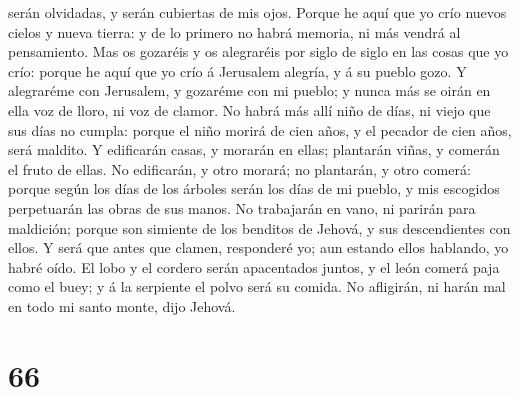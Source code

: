 serán olvidadas, y serán cubiertas de mis ojos.  Porque he
aquí que yo crío nuevos cielos y nueva tierra: y de lo primero no habrá
memoria, ni más vendrá al pensamiento.  Mas os gozaréis y
os alegraréis por siglo de siglo en las cosas que yo crío: porque he
aquí que yo crío á Jerusalem alegría, y á su pueblo gozo. 
Y alegraréme con Jerusalem, y gozaréme con mi pueblo; y nunca más se
oirán en ella voz de lloro, ni voz de clamor.  No habrá más
allí niño de días, ni viejo que sus días no cumpla: porque el niño
morirá de cien años, y el pecador de cien años, será maldito.
 Y edificarán casas, y morarán en ellas; plantarán viñas, y
comerán el fruto de ellas.  No edificarán, y otro morará;
no plantarán, y otro comerá: porque según los días de los árboles serán
los días de mi pueblo, y mis escogidos perpetuarán las obras de sus
manos.  No trabajarán en vano, ni parirán para maldición;
porque son simiente de los benditos de Jehová, y sus descendientes con
ellos.  Y será que antes que clamen, responderé yo; aun
estando ellos hablando, yo habré oído.  El lobo y el
cordero serán apacentados juntos, y el león comerá paja como el buey; y
á la serpiente el polvo será su comida. No afligirán, ni harán mal en
todo mi santo monte, dijo Jehová.

\hypertarget{section-65}{%
\section{66}\label{section-65}}


